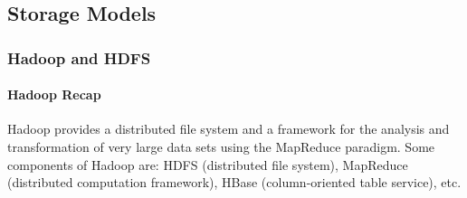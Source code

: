 


\subsection{Storage Models}

\subsubsection{Hadoop and HDFS}


\paragraph{Hadoop Recap}
Hadoop provides a distributed file system and a framework for the analysis and transformation of very large data sets using the MapReduce paradigm. Some components of Hadoop are: HDFS (distributed file system), MapReduce (distributed computation framework), HBase (column-oriented table service), etc. %

